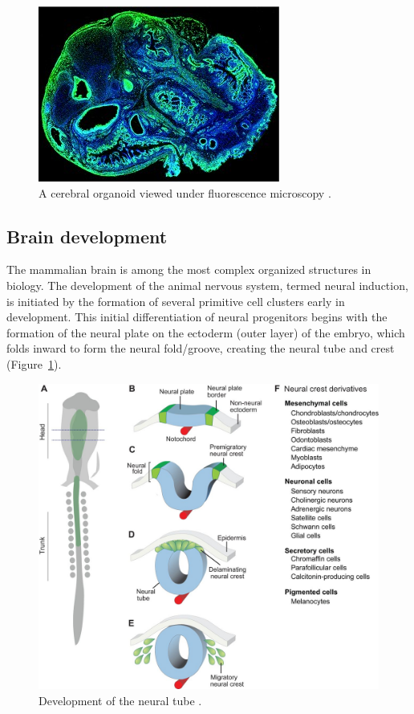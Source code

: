 \documentclass[12pt,oneside,onecolumn,a4paper]{article}
\begin{document}
\begin{figure}[h!]
\begin{center}
\includegraphics[width=0.8\columnwidth]{figures/cerebral_organoid/cerebral-organoid-for-Broad-web-300x218}
\caption{A cerebral organoid viewed under fluorescence microscopy \citep{nguyen_wang_nikolakopoulou_2015}.%
}
\end{center}
\end{figure}

\subsection{Brain development}

The mammalian brain is among the most complex organized structures in biology. The development of the animal nervous system, termed neural induction, is initiated by the formation of several primitive cell clusters early in development. This initial differentiation of neural progenitors begins with the formation of the neural plate on the ectoderm (outer layer) of the embryo, which folds inward to form the neural fold/groove, creating the neural tube and crest (Figure~\ref{fig:development}). 

\begin{figure}[h!]
\begin{center}
\includegraphics[width=0.8\columnwidth]{figures/brain_development}
\caption{Development of the neural tube \citep{neural_development}. \label{fig:development}%
}
\end{center}
\end{figure}
\end{document}
